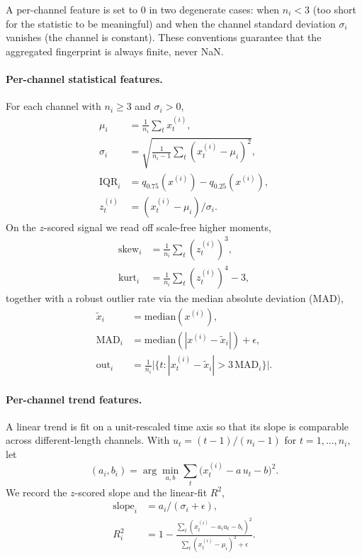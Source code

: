 A per-channel feature is set to $0$ in two degenerate cases: when
$n_i < 3$ (too short for the statistic to be meaningful) and when the
channel standard deviation $\sigma_i$ vanishes (the channel is
constant). These conventions guarantee that the aggregated fingerprint
is always finite, never NaN.

\paragraph{Per-channel statistical features.}
For each channel with $n_i \ge 3$ and $\sigma_i > 0$,
\begin{align}
\mu_i        &= \tfrac{1}{n_i} \textstyle\sum_t x^{(i)}_t, \\
\sigma_i     &= \sqrt{\tfrac{1}{n_i-1} \textstyle\sum_t (x^{(i)}_t - \mu_i)^2}, \\
\mathrm{IQR}_i &= q_{0.75}(x^{(i)}) - q_{0.25}(x^{(i)}), \\
z^{(i)}_t    &= (x^{(i)}_t - \mu_i)/\sigma_i.
\end{align}
On the $z$-scored signal we read off scale-free higher moments,
\begin{align}
\mathrm{skew}_i &= \tfrac{1}{n_i} \textstyle\sum_t (z^{(i)}_t)^3, \\
\mathrm{kurt}_i &= \tfrac{1}{n_i} \textstyle\sum_t (z^{(i)}_t)^4 - 3,
\end{align}
together with a robust outlier rate via the median absolute deviation (MAD),
\begin{align}
\widetilde{x}_i &= \mathrm{median}(x^{(i)}), \\
\mathrm{MAD}_i  &= \mathrm{median}(|x^{(i)} - \widetilde{x}_i|) + \epsilon, \\
\mathrm{out}_i  &= \tfrac{1}{n_i} \big|\{t : |x^{(i)}_t - \widetilde{x}_i| > 3\,\mathrm{MAD}_i\}\big|.
\end{align}

\paragraph{Per-channel trend features.}
A linear trend is fit on a unit-rescaled time axis so that its slope is
comparable across different-length channels. With $u_t = (t-1)/(n_i-1)$
for $t = 1, \ldots, n_i$, let
\begin{equation}
    (a_i, b_i) = \arg\min_{a, b} \textstyle\sum_t \big(x^{(i)}_t - a\, u_t - b\big)^2.
\end{equation}
We record the $z$-scored slope and the linear-fit $R^2$,
\begin{align}
\mathrm{slope}_i &= a_i / (\sigma_i + \epsilon), \\
R^2_i           &= 1 - \frac{\sum_t (x^{(i)}_t - a_i u_t - b_i)^2}
                              {\sum_t (x^{(i)}_t - \mu_i)^2 + \epsilon}.
\end{align}

